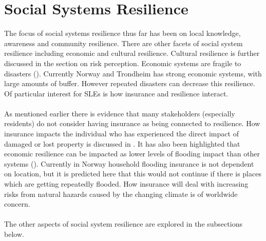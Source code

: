 \section{Social Systems Resilience}
The focus of social systems resilience thus far has been on local knowledge, awareness and community resilience. There are other facets of social system resilience including economic and cultural resilience. Cultural resilience is further discussed in the section on risk perception. Economic systems are fragile to disasters (\cite{head_comment_2020}). Currently Norway and Trondheim has strong economic systems, with large amounts of buffer. However repeated disasters can decrease this resilience. Of particular interest for SLEs is how insurance and resilience interact.
\paragraph{}
As mentioned earlier there is evidence that many stakeholders (especially residents) do not consider having insurance as being connected to resilience. How insurance impacts the individual who has experienced the direct impact of damaged or lost property is discussed in \cite{whitmarsh_are_2008}. It has also been highlighted that economic resilience can be impacted as lower levels of flooding impact than other systems (\cite{cutter_community_2020}). Currently in Norway household flooding insurance is not dependent on location, but it is predicted here that this would not continue if there is places which are getting repeatedly flooded.  How insurance will deal with increasing risks from natural hazards caused by the changing climate is of worldwide concern.

\paragraph{}
The other aspects of social system resilience are explored in the subsections below.


